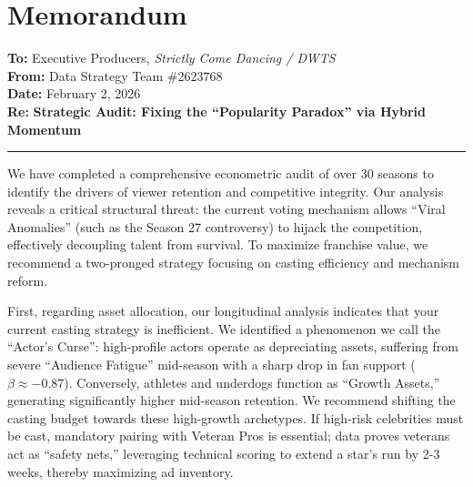\documentclass[12pt]{article}
\begin{document}

\section*{Memorandum}

\begin{flushleft}
	\textbf{To:} \hspace{2em} Executive Producers, \textit{Strictly Come Dancing / DWTS} \\
	\textbf{From:} \hspace{0.8em} Data Strategy Team \#2623768 \\
	\textbf{Date:} \hspace{0.9em} February 2, 2026 \\
	\textbf{Re:} \hspace{2.1em} \textbf{Strategic Audit: Fixing the ``Popularity Paradox'' via Hybrid Momentum}
\end{flushleft}

\vspace{-0.5em}
\hrule
\vspace{1em}

\setlength{\parindent}{0pt}
\setlength{\parskip}{1em}

We have completed a comprehensive econometric audit of over 30 seasons to identify the drivers of viewer retention and competitive integrity. Our analysis reveals a critical structural threat: the current voting mechanism allows ``Viral Anomalies'' (such as the Season 27 controversy) to hijack the competition, effectively decoupling talent from survival. To maximize franchise value, we recommend a two-pronged strategy focusing on casting efficiency and mechanism reform.

First, regarding asset allocation, our longitudinal analysis indicates that your current casting strategy is inefficient. We identified a phenomenon we call the ``Actor's Curse'': high-profile actors operate as depreciating assets, suffering from severe ``Audience Fatigue'' mid-season with a sharp drop in fan support ($\beta \approx -0.87$). Conversely, athletes and underdogs function as ``Growth Assets,'' generating significantly higher mid-season retention. We recommend shifting the casting budget towards these high-growth archetypes. If high-risk celebrities must be cast, mandatory pairing with Veteran Pros is essential; data proves veterans act as ``safety nets,'' leveraging technical scoring to extend a star's run by 2-3 weeks, thereby maximizing ad inventory.
\end{document}
